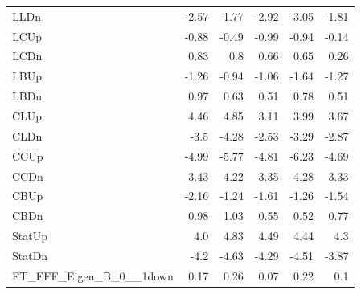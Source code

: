 \begin{table}[htbp]
{\begin{tabular}{lrrrrr}
LLDn                               & -2.57              & -1.77                & -2.92                & -3.05                & -1.81                \\
LCUp                               & -0.88              & -0.49                & -0.99                & -0.94                & -0.14                \\
LCDn                               & 0.83               & 0.8                  & 0.66                 & 0.65                 & 0.26                 \\
LBUp                               & -1.26              & -0.94                & -1.06                & -1.64                & -1.27                \\
LBDn                               & 0.97               & 0.63                 & 0.51                 & 0.78                 & 0.51                 \\
CLUp                               & 4.46               & 4.85                 & 3.11                 & 3.99                 & 3.67                 \\
CLDn                               & -3.5               & -4.28                & -2.53                & -3.29                & -2.87                \\
CCUp                               & -4.99              & -5.77                & -4.81                & -6.23                & -4.69                \\
CCDn                               & 3.43               & 4.22                 & 3.35                 & 4.28                 & 3.33                 \\
CBUp                               & -2.16              & -1.24                & -1.61                & -1.26                & -1.54                \\
CBDn                               & 0.98               & 1.03                 & 0.55                 & 0.52                 & 0.77                 \\
StatUp                             & 4.0                & 4.83                 & 4.49                 & 4.44                 & 4.3                  \\
StatDn                             & -4.2               & -4.63                & -4.29                & -4.51                & -3.87                \\
FT\_EFF\_Eigen\_B\_0\_\_1down      & 0.17               & 0.26                 & 0.07                 & 0.22                 & 0.1                  \\

\end{tabular}}
\end{table}
